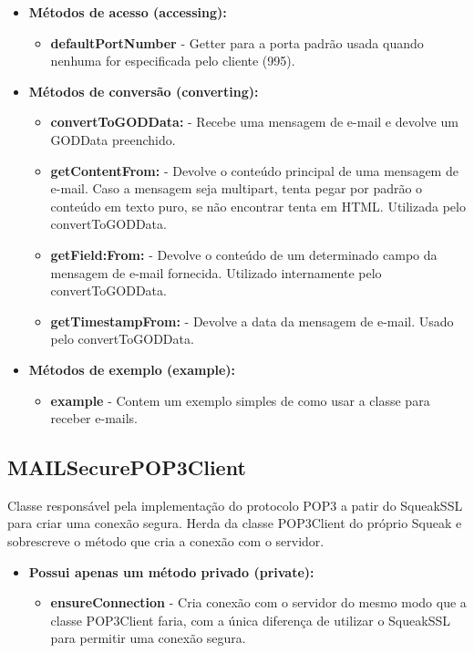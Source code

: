 \begin{itemize}
	\item \textbf{Métodos de acesso (accessing):}
	\begin{itemize}
		\item \textbf{defaultPortNumber} - Getter para a porta padrão usada quando nenhuma for especificada pelo cliente (995).
	\end{itemize}
	\item \textbf{Métodos de conversão (converting):} 
	\begin{itemize}
		\item \textbf{convertToGODData:} - Recebe uma mensagem de e-mail e devolve um GODData preenchido.
		\item \textbf{getContentFrom:} - Devolve o conteúdo principal de uma mensagem de e-mail. Caso a mensagem seja multipart, tenta pegar por padrão o conteúdo em texto puro, se não encontrar tenta em HTML. Utilizada pelo convertToGODData.
		\item \textbf{getField:From:} - Devolve o conteúdo de um determinado campo da mensagem de e-mail fornecida. Utilizado internamente pelo convertToGODData.
		\item \textbf{getTimestampFrom:} - Devolve a data da mensagem de e-mail. Usado pelo convertToGODData.
	\end{itemize}
	\item \textbf{Métodos de exemplo (example):}
	\begin{itemize}
		\item \textbf{example} - Contem um exemplo simples de como usar a classe para receber e-mails.
	\end{itemize}
\end{itemize}

\subsection{MAILSecurePOP3Client}

Classe responsável pela implementação do protocolo POP3 a patir do SqueakSSL para criar uma conexão segura. Herda da classe POP3Client do próprio Squeak e sobrescreve o método que cria a conexão com o servidor.

\begin{itemize}
	\item \textbf{Possui apenas um método privado (private):}
	\begin{itemize}
		\item \textbf{ensureConnection} - Cria conexão com o servidor do mesmo modo que a classe POP3Client faria, com a única diferença de utilizar o SqueakSSL para permitir uma conexão segura.
	\end{itemize}
\end{itemize}
